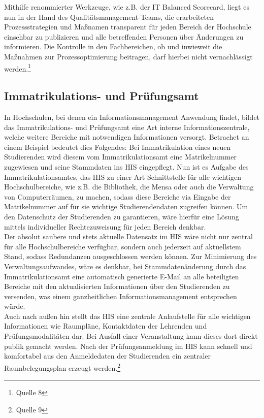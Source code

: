 Mithilfe renommierter Werkzeuge, wie z.B. der IT Balanced Scorecard, liegt es nun in der Hand des Qualitätsmanagement-Teams, die erarbeiteten Prozessstrategien und Maßnamen transparent für jeden Bereich der Hochschule einsehbar zu publizieren und alle betreffenden Personen über Änderungen zu informieren. Die Kontrolle in den Fachbereichen, ob und inwieweit die Maßnahmen zur Prozessoptimierung beitragen, darf hierbei nicht vernachlässigt werden.\footnote{Quelle 8}

\subsection{Immatrikulations- und Prüfungsamt}
In Hochschulen, bei denen ein Informationsmanagement Anwendung findet, bildet das Immatrikulations- und Prüfungsamt eine Art interne Informationszentrale, welche weitere Bereiche mit notwendigen Informationen versorgt. Betrachet an einem Beispiel bedeutet dies Folgendes: Bei Immatrikulation eines neuen Studierenden wird diesem vom Immatrikulationsamt eine Matrikelnummer zugewiesen und seine Stammdaten ins HIS eingepflegt. Nun ist es Aufgabe des Immatrikulationsamtes, das HIS zu einer Art Schnittstelle für alle wichtigen Hochschulbereiche, wie z.B. die Bibliothek, die Mensa oder auch die Verwaltung von Computerräumen, zu machen, sodass diese Bereiche via Eingabe der Matrikelnummer auf für sie wichtige Studierendendaten zugreifen können. Um den Datenschutz der Studierenden zu garantieren, wäre hierfür eine Lösung mittels individueller Rechtezuweisung für jeden Bereich denkbar.\\

Der absolut saubere und stets aktuelle Datensatz im HIS wäre nicht nur zentral für alle Hochschulbereiche verfügbar, sondern auch jederzeit auf aktuellstem Stand, sodass Redundanzen ausgeschlossen werden können. Zur Minimierung des Verwaltungsaufwandes, wäre es denkbar, bei Stammdatenänderung durch das Immatrikulationsamt eine automatisch generierte E-Mail an alle beteiligten Bereiche mit den aktualisierten Informationen über den Studierenden zu versenden, was einem ganzheitlichen Informationsmanagement entsprechen würde.\\

Auch nach außen hin stellt das HIS eine zentrale Anlaufstelle für alle wichtigen Informationen wie Raumpläne, Kontaktdaten der Lehrenden und Prüfungsmodalitäten dar. Bei Ausfall einer Veranstaltung kann dieses dort direkt publik gemacht werden. Nach der Prüfungsanmeldung im HIS kann schnell und komfortabel aus den Anmeldedaten der Studierenden ein zentraler Raumbelegungsplan erzeugt werden.\footnote{Quelle 9}\\

